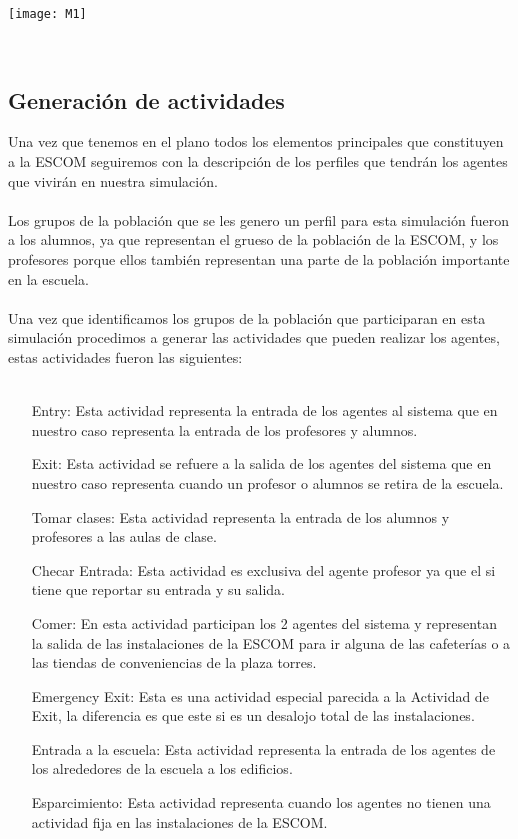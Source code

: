 \documentclass[a4paper,10pt]{article}
\begin{document}
\texttt{[image: M1]}

\\

\subsection{Generaci\'on de actividades}

Una vez que tenemos en el plano todos los elementos principales que constituyen a la ESCOM seguiremos con la descripci\'on de los perfiles que tendr\'an los agentes que vivir\'an en nuestra simulaci\'on. 
\\ \\ 
Los grupos de la poblaci\'on que se les genero un perfil para esta simulaci\'on fueron a los alumnos, ya que representan el grueso de la poblaci\'on de la ESCOM, y los profesores porque ellos tambi\'en representan una parte de la poblaci\'on importante en la escuela.
\\ \\
Una vez que identificamos los grupos de la poblaci\'on que participaran en esta simulaci\'on procedimos a generar las actividades que pueden realizar los agentes, estas actividades fueron las siguientes:
\\ \\

\begin{enumerate}
 \item[Entry:]Esta actividad representa la entrada de los agentes al sistema que en nuestro caso representa la entrada de los profesores y alumnos.
 \item[Exit:]Esta actividad se refuere a la salida de los agentes del sistema que en nuestro caso representa cuando un profesor o alumnos se retira de la escuela.
 \item[Tomar clases:]Esta actividad representa la entrada de los alumnos y profesores a  las aulas de clase.
 \item[Checar Entrada:]Esta actividad es exclusiva del agente profesor ya que el si tiene que reportar su entrada y su salida.
 \item[Comer:]En esta actividad participan los 2 agentes del sistema y representan la salida de las instalaciones de la ESCOM para ir alguna de las cafeter\'ias o a las tiendas de conveniencias de la plaza torres.
 \item[Emergency Exit:]Esta es una actividad especial parecida a la Actividad de Exit, la diferencia es que este si es un desalojo total de las instalaciones.
 \item[Entrada a la escuela:]Esta actividad representa la entrada de los agentes de los alrededores de la escuela a los edificios.
 \item[Esparcimiento:]Esta actividad representa cuando los agentes no tienen una actividad fija en las instalaciones de la ESCOM.

\end{enumerate}
\end{document}
